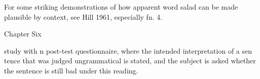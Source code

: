\begin{listWWNumxxleveli}
\item 
\begin{styleStandard}
For some striking demonstrations of how apparent word salad can be made plausible by context, see Hill 1961, especially fn. 4.
\end{styleStandard}


\end{listWWNumxxleveli}
\clearpage\setcounter{page}{1}\begin{styleStandard}
Chapter Six
\end{styleStandard}


\begin{styleTextbody}
study with n post-test questionnaire, where the intended interpretation of a sen\- tence that was judged ungrammatical is stated, and the subject is asked whether the sentence is still bad under this reading.
\end{styleTextbody}


